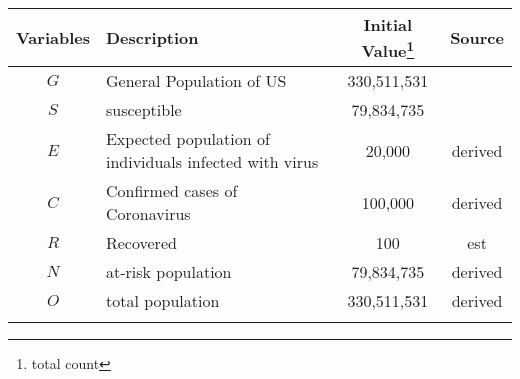 \documentclass{amsart}
\begin{document}
\begin{minipage}{1.0\textwidth}
	\begin{table}[H]
		\centering
		\scalebox{0.8} { %
		\begin{tabular}{|c|l|c|c|}
			\hline

			\textbf{Variables} & \textbf{Description} & \textbf{Initial Value}\footnote{total count} & \textbf{Source} \\
		  	\hline
			$G$ & General Population of US & 330,511,531 & \cite{CA_pop_1980} \\ \hline

			$S$ & susceptible & 79,834,735 & \cite{CA_ACS_poverty} \cite{CA_ACS_edu} \\ \hline

			$E$ & Expected population of individuals infected with virus & 20,000 & derived \\ \hline

			$C$ & Confirmed cases of Coronavirus & 100,000 & derived \\ \hline


			$R$ & Recovered & 100 & est \\ \hline
	
			$N$ & at-risk population & 79,834,735 & derived \\ \hline
			$O$ & total population & 330,511,531  & derived \\ \hline
			& & & \\ \hline


\end{tabular}}
\end{table}
\end{minipage}
\end{document}

